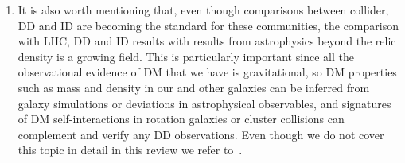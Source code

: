 \begin{issues}
\begin{enumerate}
\item It is also worth mentioning that, even though comparisons between collider, DD and ID are becoming the standard for these communities,
the comparison with LHC, DD and ID results with results from astrophysics beyond the relic density is a growing field. 
This is particularly important since all the observational evidence of DM that we have is gravitational,
so DM properties such as mass and density in our and other galaxies
can be inferred from galaxy simulations or deviations in astrophysical observables, 
and signatures of DM self-interactions in rotation galaxies or cluster collisions can complement and verify any DD 
observations. Even though we do not cover this topic in detail in this review we refer to~\cite{Buckley:2017ijx}. 


\end{enumerate}
\end{issues}
